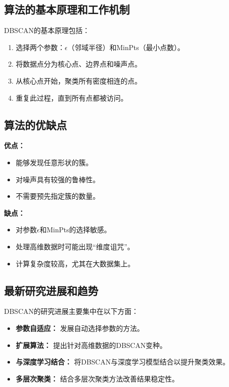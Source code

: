 \subsection*{算法的基本原理和工作机制}
DBSCAN的基本原理包括：
\begin{enumerate}
    \item 选择两个参数：\(\epsilon\)（邻域半径）和MinPts（最小点数）。
    \item 将数据点分为核心点、边界点和噪声点。
    \item 从核心点开始，聚类所有密度相连的点。
    \item 重复此过程，直到所有点都被访问。
\end{enumerate}

\subsection*{算法的优缺点}
\textbf{优点：}
\begin{itemize}
    \item 能够发现任意形状的簇。
    \item 对噪声具有较强的鲁棒性。
    \item 不需要预先指定簇的数量。
\end{itemize}

\textbf{缺点：}
\begin{itemize}
    \item 对参数\(\epsilon\)和MinPts的选择敏感。
    \item 处理高维数据时可能出现“维度诅咒”。
    \item 计算复杂度较高，尤其在大数据集上。
\end{itemize}

\subsection*{最新研究进展和趋势}
DBSCAN的研究进展主要集中在以下方面：
\begin{itemize}
    \item \textbf{参数自适应：} 发展自动选择参数的方法。
    \item \textbf{扩展算法：} 提出针对高维数据的DBSCAN变种。
    \item \textbf{与深度学习结合：} 将DBSCAN与深度学习模型结合以提升聚类效果。
    \item \textbf{多层次聚类：} 结合多层次聚类方法改善结果稳定性。
\end{itemize}
